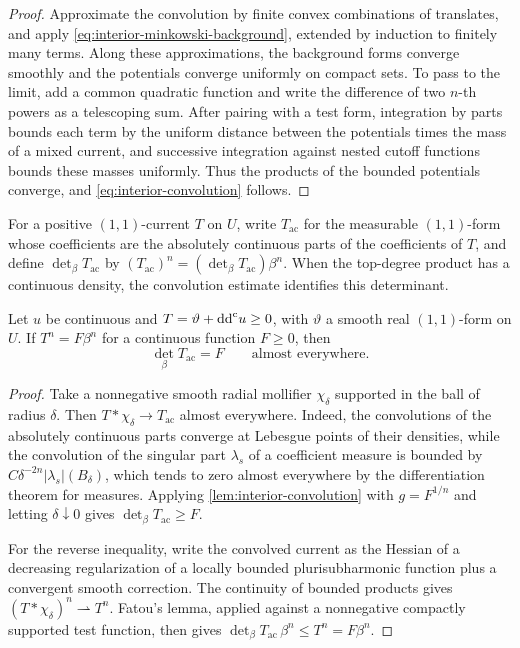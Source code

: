 \begin{proof}
Approximate the convolution by finite convex combinations of translates, and apply \eqref{eq:interior-minkowski-background}, extended by induction to finitely many terms. Along these approximations, the background forms converge smoothly and the potentials converge uniformly on compact sets. To pass to the limit, add a common quadratic function and write the difference of two $n$-th powers as a telescoping sum. After pairing with a test form, integration by parts bounds each term by the uniform distance between the potentials times the mass of a mixed current, and successive integration against nested cutoff functions bounds these masses uniformly. Thus the products of the bounded potentials converge, and \eqref{eq:interior-convolution} follows.
\end{proof}

For a positive $(1,1)$-current $T$ on $U$, write $T_{\mathrm{ac}}$ for the measurable $(1,1)$-form whose coefficients are the absolutely continuous parts of the coefficients of $T$, and define $\det_\beta T_{\mathrm{ac}}$ by $(T_{\mathrm{ac}})^n=(\det_\beta T_{\mathrm{ac}})\beta^n$. When the top-degree product has a continuous density, the convolution estimate identifies this determinant.

\begin{lemma}\label{lem:continuous-density-coefficients}
Let $u$ be continuous and $T=\vartheta+\mathrm{dd}^{\mathrm{c}} u\geq0$, with $\vartheta$ a smooth real $(1,1)$-form on $U$. If $T^n=F\beta^n$ for a continuous function $F\geq0$, then
\[
 \det_\beta T_{\mathrm{ac}}=F\qquad\text{almost everywhere}.
\]
\end{lemma}
\begin{proof}
Take a nonnegative smooth radial mollifier $\chi_\delta$ supported in the ball of radius $\delta$. Then $T*\chi_\delta\to T_{\mathrm{ac}}$ almost everywhere. Indeed, the convolutions of the absolutely continuous parts converge at Lebesgue points of their densities, while the convolution of the singular part $\lambda_s$ of a coefficient measure is bounded by $C\delta^{-2n}|\lambda_s|(B_\delta)$, which tends to zero almost everywhere by the differentiation theorem for measures. Applying \cref{lem:interior-convolution} with $g=F^{1/n}$ and letting $\delta\downarrow0$ gives $\det_\beta T_{\mathrm{ac}}\geq F$.

For the reverse inequality, write the convolved current as the Hessian of a decreasing regularization of a locally bounded plurisubharmonic function plus a convergent smooth correction. The continuity of bounded products gives $(T*\chi_\delta)^n\rightharpoonup T^n$. Fatou's lemma, applied against a nonnegative compactly supported test function, then gives $\det_\beta T_{\mathrm{ac}}\,\beta^n\leq T^n=F\beta^n$.
\end{proof}


